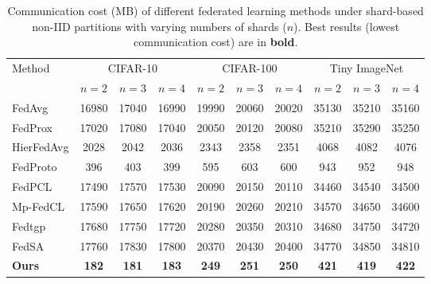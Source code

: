 \documentclass[twoside]{article}
\begin{document}
        \begin{table}[t]
        \centering
        \caption{Communication cost (MB) of different federated learning methods under shard-based non-IID partitions with varying numbers of shards ($n$). Best results (lowest communication cost) are in \textbf{bold}.}
        \label{tab:comm_cost}
        \begin{tabular}{lccccccccc}
        \toprule
        \multirow{2}{*}{Method} & \multicolumn{3}{c}{CIFAR-10} & \multicolumn{3}{c}{CIFAR-100} & \multicolumn{3}{c}{Tiny ImageNet} \\
         & $n{=}2$ & $n{=}3$ & $n{=}4$ & $n{=}2$ & $n{=}3$ & $n{=}4$ & $n{=}2$ & $n{=}3$ & $n{=}4$ \\
        \midrule
        FedAvg     & 16980 & 17040 & 16990 & 19990 & 20060 & 20020 & 35130 & 35210 & 35160 \\
        FedProx    & 17020 & 17080 & 17040 & 20050 & 20120 & 20080 & 35210 & 35290 & 35250 \\
        HierFedAvg & 2028  & 2042  & 2036  & 2343  & 2358  & 2351  & 4068  & 4082  & 4076  \\
        FedProto   & 396   & 403   & 399   & 595   & 603   & 600   & 943   & 952   & 948   \\
        FedPCL     & 17490 & 17570 & 17530 & 20090 & 20150 & 20110 & 34460 & 34540 & 34500 \\
        Mp-FedCL   & 17590 & 17650 & 17620 & 20190 & 20260 & 20210 & 34570 & 34650 & 34600 \\
        Fedtgp     & 17680 & 17750 & 17720 & 20280 & 20350 & 20310 & 34680 & 34750 & 34720 \\
        FedSA      & 17760 & 17830 & 17800 & 20370 & 20430 & 20400 & 34770 & 34850 & 34810 \\
        \midrule
        \textbf{Ours} & \textbf{182} & \textbf{181} & \textbf{183} & \textbf{249} & \textbf{251} & \textbf{250} & \textbf{421} & \textbf{419} & \textbf{422} \\
        \bottomrule
        \end{tabular}
        \end{table}
\end{document}
